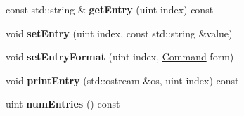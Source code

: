 \begin{DoxyCompactItemize}
\item 
\hypertarget{class_t_c_o_m_1_1_column_aeb6198497bf285df3cb3d24c1137cf38}{const std\-::string \& {\bfseries get\-Entry} (uint index) const }\label{class_t_c_o_m_1_1_column_aeb6198497bf285df3cb3d24c1137cf38}

\item 
\hypertarget{class_t_c_o_m_1_1_column_af1ee7884c8e1b4f4c565f9eeff0e8a98}{void {\bfseries set\-Entry} (uint index, const std\-::string \&value)}\label{class_t_c_o_m_1_1_column_af1ee7884c8e1b4f4c565f9eeff0e8a98}

\item 
\hypertarget{class_t_c_o_m_1_1_column_a6e5036af803a5952d98103790ac824e4}{void {\bfseries set\-Entry\-Format} (uint index, \hyperlink{class_t_c_o_m_1_1_command}{Command} form)}\label{class_t_c_o_m_1_1_column_a6e5036af803a5952d98103790ac824e4}

\item 
\hypertarget{class_t_c_o_m_1_1_column_a15c301ccb383f04a4f9c7240b4028ee3}{void {\bfseries print\-Entry} (std\-::ostream \&os, uint index) const }\label{class_t_c_o_m_1_1_column_a15c301ccb383f04a4f9c7240b4028ee3}

\item 
\hypertarget{class_t_c_o_m_1_1_column_a58f5c88985f810903a5fc8a6eeffc6da}{uint {\bfseries num\-Entries} () const }\label{class_t_c_o_m_1_1_column_a58f5c88985f810903a5fc8a6eeffc6da}

\end{DoxyCompactItemize}
